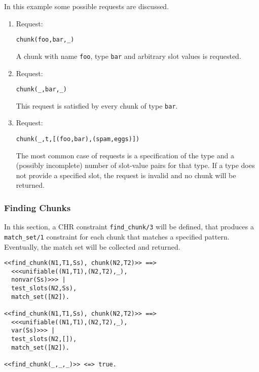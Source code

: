 \begin{example}
In this example some possible requests are discussed.

\begin{enumerate}
 \item Request:
\begin{lstlisting}
chunk(foo,bar,_)        
\end{lstlisting}

A chunk with name \verb|foo|, type \verb|bar| and arbitrary slot values is requested.

 \item Request:
\begin{lstlisting}
chunk(_,bar,_)        
\end{lstlisting}

This request is satisfied by every chunk of type \verb|bar|.

 \item Request:
\begin{lstlisting}
chunk(_,t,[(foo,bar),(spam,eggs)])        
\end{lstlisting}

The most common case of requests is a specification of the type and a (possibly incomplete) number of slot-value pairs for that type. If a type does not provide a specified slot, the request is invalid and no chunk will be returned.

\end{enumerate}

\end{example}

\subsubsection{Finding Chunks}

In this section, a CHR constraint \verb|find_chunk/3| will be defined, that produces a \verb|match_set/1| constraint for each chunk that matches a specified pattern. Eventually, the match set will be collected and returned.

\begin{lstlisting}
<<find_chunk(N1,T1,Ss), chunk(N2,T2)>> ==> 
  <<<unifiable((N1,T1),(N2,T2),_), 
  nonvar(Ss)>>> | 
  test_slots(N2,Ss), 
  match_set([N2]).
  
<<find_chunk(N1,T1,Ss), chunk(N2,T2)>> ==> 
  <<<unifiable((N1,T1),(N2,T2),_), 
  var(Ss)>>> | 
  test_slots(N2,[]), 
  match_set([N2]).

<<find_chunk(_,_,_)>> <=> true.
\end{lstlisting}


